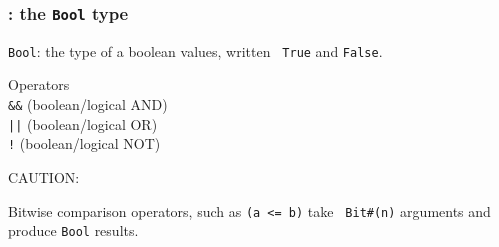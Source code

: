 
\begin{frame}[fragile]
\frametitle{{\BSV}: the {\tt Bool} type}

\footnotesize

\verb|Bool|: the type of a boolean values, written {\tt
True} and {\tt False}.

\vspace{1ex}

Operators \\
\hmmmm \verb|&&| (boolean/logical AND) \\
\hmmmm \verb'||' (boolean/logical OR)  \\
\hmmmm \verb|!| (boolean/logical NOT)  \\

\vspace{4ex}

CAUTION: 

\vspace{2ex}

Bitwise comparison operators, such as {\tt (a <= b)} take {\tt
Bit\#(n)} arguments and produce {\tt Bool} results.


\end{frame}


